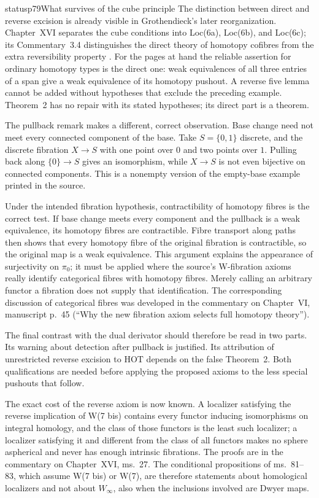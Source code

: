 \begin{dcomment}{status}{p79}{What survives of the cube principle}
The distinction between direct and reverse excision is already visible in Grothendieck's later reorganization. Chapter~XVI separates the cube conditions into Loc(6a), Loc(6b), and Loc(6c); its Commentary~3.4 distinguishes the direct theory of homotopy cofibres from the extra reversibility property \citep[\S3, manuscript pp.~16--27]{GrothendieckDerivateursXVI}. For the pages at hand the reliable assertion for ordinary homotopy types is the direct one: weak equivalences of all three entries of a span give a weak equivalence of its homotopy pushout. A reverse five lemma cannot be added without hypotheses that exclude the preceding example. Theorem~2 has no repair with its stated hypotheses; its direct part is a theorem.

The pullback remark makes a different, correct observation. Base change need not meet every connected component of the base. Take $S=\{0,1\}$ discrete, and the discrete fibration $X\to S$ with one point over $0$ and two points over $1$. Pulling back along $\{0\}\to S$ gives an isomorphism, while $X\to S$ is not even bijective on connected components. This is a nonempty version of the empty-base example printed in the source.

Under the intended fibration hypothesis, contractibility of homotopy fibres is the correct test. If base change meets every component and the pullback is a weak equivalence, its homotopy fibres are contractible. Fibre transport along paths then shows that every homotopy fibre of the original fibration is contractible, so the original map is a weak equivalence. This argument explains the appearance of surjectivity on $\pi_0$; it must be applied where the source's W-fibration axioms really identify categorical fibres with homotopy fibres. Merely calling an arbitrary functor a fibration does not supply that identification. The corresponding discussion of categorical fibres was developed in the commentary on Chapter~VI, manuscript p.~45 (``Why the new fibration axiom selects full homotopy theory'').

The final contrast with the dual derivator should therefore be read in two parts. Its warning about detection after pullback is justified. Its attribution of unrestricted reverse excision to $\mathrm{HOT}$ depends on the false Theorem~2. Both qualifications are needed before applying the proposed axioms to the less special pushouts that follow.

The exact cost of the reverse axiom is now known. A localizer satisfying the reverse implication of W(7 bis) contains every functor inducing isomorphisms on integral homology, and the class of those functors is the least such localizer; a localizer satisfying it and different from the class of all functors makes no sphere aspherical and never has enough intrinsic fibrations. The proofs are in the commentary on Chapter~XVI, ms.~27. The conditional propositions of ms.~81--83, which assume W(7 bis) or W(7), are therefore statements about homological localizers and not about $W_\infty$, also when the inclusions involved are Dwyer maps.
\end{dcomment}


